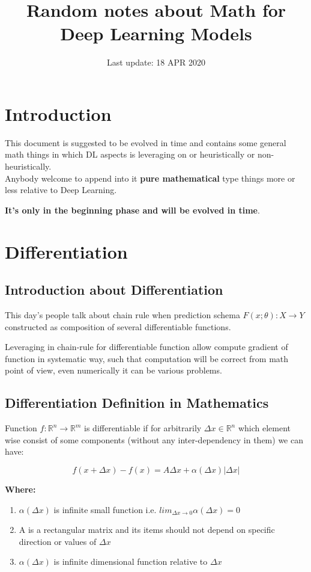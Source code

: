 \documentclass[12pt,a4paper]{article}
\title{Random notes about Math for Deep Learning Models}
\date{Last update: 18 APR 2020}
\theoremstyle{plain}
\begin{document}
	
\maketitle
\tableofcontents
\section{Introduction}
This document is suggested to be evolved in time and contains some general math things in which DL aspects is leveraging on or heuristically or non-heuristically.\\
Anybody welcome to append into it \textbf{pure mathematical} type things more or less relative to Deep Learning.

 \textbf{It's only in the beginning phase and will be evolved in time}.
\section{Differentiation}
\subsection{Introduction about Differentiation}
This day’s people talk about chain rule when prediction schema $F(x;\theta):X \to Y$ constructed as composition of several differentiable functions.


Leveraging in chain-rule for differentiable function allow compute gradient of function in systematic way, such that computation will be correct from math point of view, even numerically it can be various problems.

\subsection{Differentiation Definition in Mathematics}
Function $f:\mathbb{R}^{n} \rightarrow \mathbb{R}^{m}$ 
is differentiable if for arbitrarily $\varDelta x \in \mathbb{R}^{n}$ which element wise consist of some components (without any inter-dependency in them) we can have:

\begin{equation}
f(x+\varDelta x)-f(x) = A \varDelta x + \alpha(\varDelta x)|\varDelta x|
\end{equation} 

\textbf{Where:}
\begin{enumerate}
 \item $\alpha(\varDelta x)$ is infinite small function i.e. $lim_{\varDelta x \rightarrow 0} \alpha(\varDelta x) = 0$
 \item A is a rectangular matrix and its items should not depend on specific direction or values of $\varDelta x$
 \item $\alpha(\varDelta x)$ is infinite dimensional function relative to $\varDelta x$
\end{enumerate}
\end{document}
